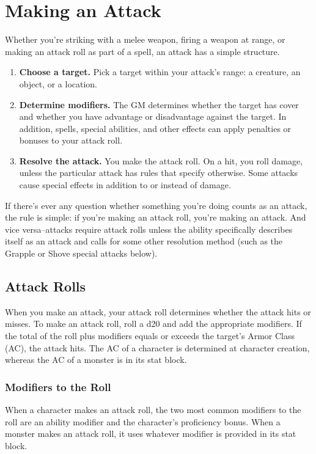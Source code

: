 \section{Making an Attack}

Whether you're striking with a melee weapon, firing a weapon at range, or making an attack roll as part of a spell, an attack has a simple structure.

\begin{enumerate}
\item \textbf{Choose a target.} Pick a target within your attack's range: a creature, an object, or a location.
\item \textbf{Determine modifiers.} The GM determines whether the target has cover and whether you have advantage or disadvantage against the target. In addition, spells, special abilities, and other effects can apply penalties or bonuses to your attack roll.
\item \textbf{Resolve the attack.} You make the attack roll. On a hit, you roll damage, unless the particular attack has rules that specify otherwise. Some attacks cause special effects in addition to or instead of damage.
\end{enumerate}

If there's ever any question whether something you're doing counts as an attack, the rule is simple: if you're making an attack roll, you're making an attack. And vice versa--attacks require attack rolls unless the ability specifically describes itself as an attack and calls for some other resolution method (such as the Grapple or Shove special attacks below).

\subsection{Attack Rolls}

When you make an attack, your attack roll determines whether the attack hits or misses. To make an attack roll, roll a d20 and add the appropriate modifiers. If the total of the roll plus modifiers equals or exceeds the target's Armor Class (AC), the attack hits. The AC of a character is determined at character creation, whereas the AC of a monster is in its stat block.

\subsubsection{Modifiers to the Roll}

When a character makes an attack roll, the two most common modifiers to the roll are an ability modifier and the character's proficiency bonus. When a monster makes an attack roll, it uses whatever modifier is provided in its stat block.

